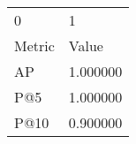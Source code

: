 \begin{tabular}{ll}
0 & 1 \\
Metric & Value \\
AP & 1.000000 \\
P@5 & 1.000000 \\
P@10 & 0.900000 \\
\end{tabular}
